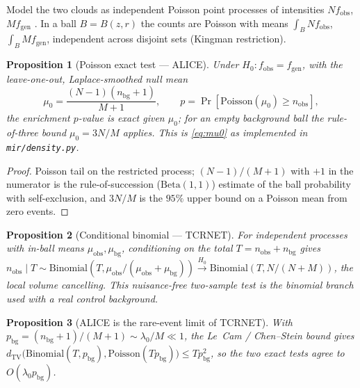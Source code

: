 \documentclass[11pt]{article}
\theoremstyle{oldplain}
\newtheorem{proposition}{Proposition}
\theoremstyle{oldrem}
\newcommand{\code}[1]{\texttt{#1}}
\begin{document}
Model the two clouds as independent Poisson point processes of intensities $Nf_{\mathrm{obs}}$,
$Mf_{\mathrm{gen}}$ \cite{Kingman1993}. In a ball $B=B(z,r)$ the counts are Poisson with means
$\int_B Nf_{\mathrm{obs}}$, $\int_B Mf_{\mathrm{gen}}$, independent across disjoint sets (Kingman restriction).

\begin{proposition}[Poisson exact test --- {\scshape ALICE}]\label{prop:poissontest}
Under $H_0:f_{\mathrm{obs}}=f_{\mathrm{gen}}$, with the leave-one-out, Laplace-smoothed null mean
\begin{equation}\label{eq:mu0}
  \mu_0=\frac{(N-1)(n_{\mathrm{bg}}+1)}{M+1},\qquad
  p=\Pr[\mathrm{Poisson}(\mu_0)\ge n_{\mathrm{obs}}],
\end{equation}
the enrichment $p$-value is exact given $\mu_0$; for an empty background ball the rule-of-three bound
$\mu_0=3N/M$ applies. This is \eqref{eq:mu0} as implemented in \code{mir/density.py}.
\end{proposition}
\begin{proof}
Poisson tail on the restricted process; $(N-1)/(M+1)$ with $+1$ in the numerator is the rule-of-succession
($\mathrm{Beta}(1,1)$) estimate of the ball probability with self-exclusion, and $3N/M$ is the $95\%$ upper
bound on a Poisson mean from zero events.
\end{proof}

\begin{proposition}[Conditional binomial --- {\scshape TCRNET}]\label{prop:ctest}
For independent processes with in-ball means $\mu_{\mathrm{obs}},\mu_{\mathrm{bg}}$, conditioning on the total
$T=n_{\mathrm{obs}}+n_{\mathrm{bg}}$ gives
$n_{\mathrm{obs}}\mid T\sim\mathrm{Binomial}(T,\mu_{\mathrm{obs}}/(\mu_{\mathrm{obs}}+\mu_{\mathrm{bg}}))
\xrightarrow{H_0}\mathrm{Binomial}(T,N/(N{+}M))$, the local volume cancelling. This nuisance-free two-sample
test \cite{Krishnamoorthy2004} is the binomial branch used with a real control background.
\end{proposition}

\begin{proposition}[{\scshape ALICE} is the rare-event limit of {\scshape TCRNET}]\label{prop:alicelim}
With $p_{\mathrm{bg}}=(n_{\mathrm{bg}}{+}1)/(M{+}1)\sim\lambda_0/M\ll1$, the Le~Cam / Chen--Stein bound
\cite{Arratia1990} gives
$d_{\mathrm{TV}}\big(\mathrm{Binomial}(T,p_{\mathrm{bg}}),\mathrm{Poisson}(Tp_{\mathrm{bg}})\big)\le
Tp_{\mathrm{bg}}^2$, so the two exact tests agree to $O(\lambda_0 p_{\mathrm{bg}})$.
\end{proposition}
\end{document}

